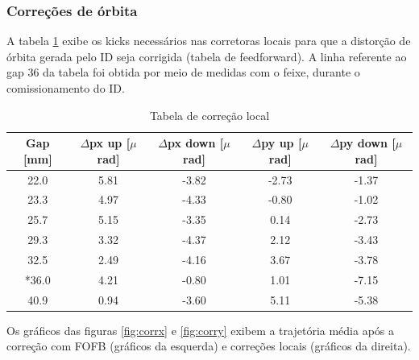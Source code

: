 \documentclass[a4paper,12pt]{article}
\begin{document}
\subsubsection{Correções de órbita}

A tabela \ref{tab:corff0} exibe os kicks necessários nas corretoras locais para que a distorção de órbita gerada pelo ID seja corrigida (tabela de feedforward). A linha referente ao gap 36 da tabela foi obtida por meio de medidas com o feixe, durante o comissionamento do ID.

\begin{table}[H]
\centering
\caption{Tabela de correção local}
\begin{tabular}{|c|c|c|c|c|}
\hline
Gap {[}mm{]} & $\Delta$px up {[}$\mu$rad{]} & $\Delta$px down {[}$\mu$rad{]} & $\Delta$py up {[}$\mu$rad{]} & $\Delta$py down {[}$\mu$rad{]} \\ \hline
22.0 & 5.81  & -3.82 & -2.73 & -1.37 \\ \hline
23.3 & 4.97  & -4.33 & -0.80 & -1.02 \\ \hline
25.7 & 5.15  & -3.35 &  0.14 & -2.73 \\ \hline
29.3 & 3.32  & -4.37 & 2.12 & -3.43 \\ \hline
32.5 &  2.49 & -4.16 & 3.67 & -3.78 \\ \hline
*36.0 & 4.21 & -0.80 & 1.01 & -7.15 \\ \hline
40.9 & 0.94  & -3.60 & 5.11 & -5.38  \\ \hline
\end{tabular}
\label{tab:corff0}
\end{table}

Os gráficos das figuras \ref{fig:corrx} e \ref{fig:corry} exibem a trajetória média após a correção com FOFB (gráficos da esquerda) e correções locais (gráficos da direita).
\end{document}
